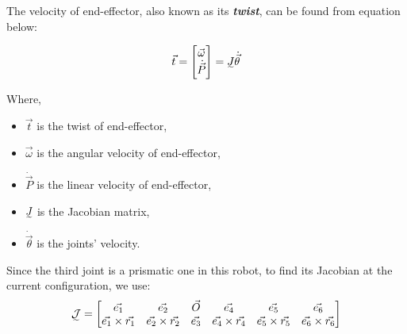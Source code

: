 \documentclass[conference]{IEEEtran}
\begin{document}
The velocity of end-effector, also known as its \textbf{\textit{twist}}, can be found from equation below:

\begin{align}
    \vec{t} = \begin{bmatrix}
                  \vec{\omega} \\
                  \dot{\vec{P}}
              \end{bmatrix} = \undertilde{J} \dot{\vec{\theta}} \label{eq:twist}
\end{align}

Where,
\begin{itemize}
    \item $\vec{t}$ is the twist of end-effector,
    \item $\vec{\omega}$ is the angular velocity of end-effector,
    \item $\dot{\vec{P}}$ is the linear velocity of end-effector,
    \item $\undertilde{J}$ is the Jacobian matrix,
    \item $\dot{\vec{\theta}}$ is the joints' velocity.
\end{itemize}

Since the third joint is a prismatic one in this robot, to find its Jacobian at the current configuration, we use:
\begin{align}
    \undertilde{\mathcal{J}} = \begin{bmatrix}
                                   \vec{e_1}                  & \vec{e_2}                  & \vec{O}   & \vec{e_4}                  & \vec{e_5}                  & \vec{e_6}                  \\
                                   \vec{e_1} \times \vec{r_1} & \vec{e_2} \times \vec{r_2} & \vec{e_3} & \vec{e_4} \times \vec{r_4} & \vec{e_5} \times \vec{r_5} & \vec{e_6} \times \vec{r_6} \\
                               \end{bmatrix}
\end{align}
\end{document}
